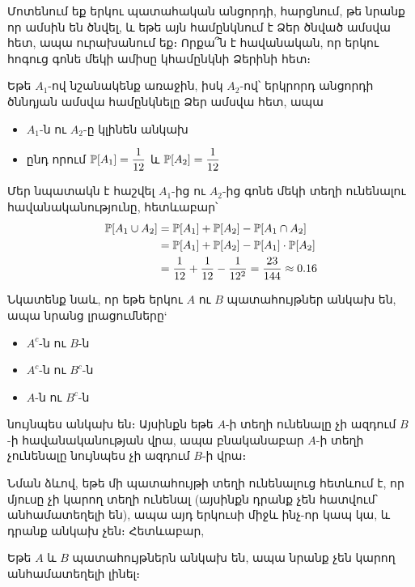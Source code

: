 
\begin{example}
Մոտենում եք երկու պատահական անցորդի, հարցնում, թե նրանք որ ամսին են ծնվել, և եթե այն համընկնում է Ձեր ծնված ամսվա հետ, ապա ուրախանում եք։ Որքա՞ն է հավանական, որ երկու հոգուց գոնե մեկի ամիսը կհամընկնի Ձերինի հետ։

Եթե $A_1$-ով նշանակենք առաջին, իսկ $A_2$-ով՝ երկրորդ անցորդի ծննդյան ամսվա համընկնելը Ձեր ամսվա հետ, ապա
\begin{itemize}
    \item $A_1$-ն ու $A_2$-ը կլինեն անկախ
    \item ընդ որում $\mathbb{P}[A_1] = \dfrac{1}{12}$ և $\mathbb{P}[A_2] = \dfrac{1}{12}$ 
\end{itemize}

Մեր նպատակն է հաշվել $A_1$-ից ու $A_2$-ից գոնե մեկի տեղի ունենալու հավանականությունը, հետևաբար՝
\begin{align*}
\mathbb{P}[A_1 \cup A_2] &= \mathbb{P}[A_1] + \mathbb{P}[A_2] - \mathbb{P}[A_1 \cap A_2] \\&= \mathbb{P}[A_1] + \mathbb{P}[A_2] - \mathbb{P}[A_1] \cdot \mathbb{P}[A_2] \\&= \frac{1}{12} + \frac{1}{12} - \frac{1}{12^2} = \frac{23}{144} \approx 0.16
\end{align*}
\end{example}

Նկատենք նաև, որ եթե երկու $A$ ու $B$ պատահույթներ անկախ են,  ապա նրանց լրացումները`
\begin{itemize}
    \item $A^c$-ն ու $B$-ն
    \item $A^c$-ն ու $B^c$-ն
    \item $A$-ն ու $B^c$-ն
\end{itemize}
նույնպես անկախ են։ Այսինքն եթե $A$-ի տեղի ունենալը չի ազդում $B$-ի հավանականության վրա, ապա բնականաբար $A$-ի տեղի չունենալը նույնպես չի ազդում $B$-ի վրա։

Նման ձևով, եթե մի պատահույթի տեղի ունենալուց հետևում է, որ մյուսը չի կարող տեղի ունենալ (այսինքն դրանք չեն հատվում՝ անհամատեղելի են), ապա այդ երկուսի միջև ինչ-որ կապ կա, և դրանք անկախ չեն։ Հետևաբար,
\begin{theorem}
Եթե $A$ և $B$ պատահույթներն անկախ են, ապա նրանք չեն կարող անհամատեղելի լինել։
\end{theorem}

